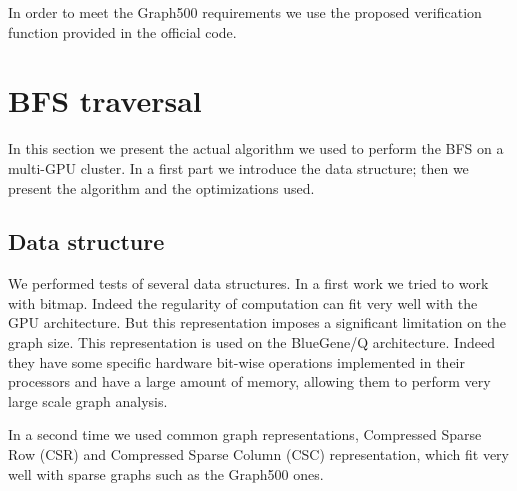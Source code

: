 In order to meet the Graph500 requirements we use the proposed verification function provided in the official code.

\section{BFS traversal}
In this section we present the actual algorithm we used to perform the BFS on a multi-GPU cluster. 
In a first part we introduce the data structure; then we present the algorithm and the optimizations used.

\subsection{Data structure}
We performed tests of several data structures.
In a first work we tried to work with bitmap. Indeed the regularity of computation can fit very well with the GPU architecture. But this representation imposes a significant limitation on the graph size. 
This representation is used on the BlueGene/Q architecture. 
Indeed they have some specific hardware bit-wise operations implemented in their processors and have a large amount of memory, allowing them to perform very large scale graph analysis. 

In a second time we used common graph representations, Compressed Sparse Row (CSR) and Compressed Sparse Column (CSC) representation, which fit very well with sparse graphs such as the Graph500 ones.

